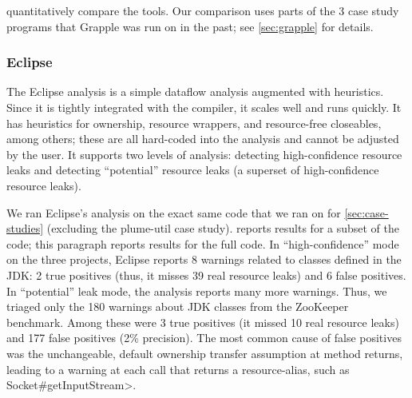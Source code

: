  quantitatively compare the
tools.  Our comparison uses parts of the 3 case study programs that Grapple was
run on in the past; see \cref{sec:grapple} for details.




\subsubsection{Eclipse}
\label{sec:eclipse}

The Eclipse analysis is a simple dataflow analysis
augmented with heuristics. Since it is tightly integrated with
the compiler, it scales well and runs quickly. It has
heuristics for ownership, resource wrappers, and resource-free
closeables, among others; these are all hard-coded into the analysis and cannot
be adjusted by the user.
It supports two levels of analysis: detecting high-confidence resource
leaks and detecting ``potential'' resource
leaks (a superset of high-confidence resource leaks).

We ran Eclipse's analysis on the exact same code
that we ran \tool on for \cref{sec:case-studies} (excluding the plume-util case study).
 reports results for a subset of the code; this
paragraph reports results for the full code.
In ``high-confidence'' mode on the three projects, Eclipse reports 8
warnings related to classes defined in the JDK:
2 true positives (thus, it misses 39 real resource leaks) and 6
false positives.
In ``potential'' leak mode, the analysis reports many more warnings.
Thus, we triaged only the 180
warnings about JDK classes from the ZooKeeper benchmark.
Among these were 3 true positives (it missed 10 real resource leaks) and 177 false
positives (2\% precision).
The most common cause of false
positives was the unchangeable, default ownership transfer assumption
at method returns, leading to a warning at each call that returns a resource-alias, such as
\<Socket\#getInputStream>.



